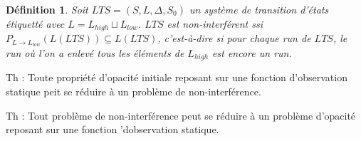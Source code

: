 \documentclass[10pt,a4paper]{article}
\newtheorem {mydef} {D\'efinition}
\begin{document}
\begin{mydef}
  Soit $LTS = (S,L,\Delta,S_0)$ un syst\`eme de transition d'\'etats \'etiquett\'e avec $L=L_{high}\sqcup L_{low}$. $LTS$ est non-interf\'erent ssi $P_{L\to L_{low}}(L(LTS)) \subseteq L(LTS)$, c'est-\`a-dire si pour chaque run de $LTS$, le run o\`u l'on a enlev\'e tous les \'el\'ements de $L_{high}$ est encore un run.
\end{mydef}

Th : Toute propri\'et\'e d'opacit\'e initiale reposant sur une fonction d'observation statique peit se r\'eduire \`a un probl\`eme  de non-interf\'erence.

Th : Tout probl\`eme de non-interf\'erence peut se r\'eduire \`a un probl\`eme d'opacit\'e reposant sur une fonction 'dobservation statique.
\end{document}

